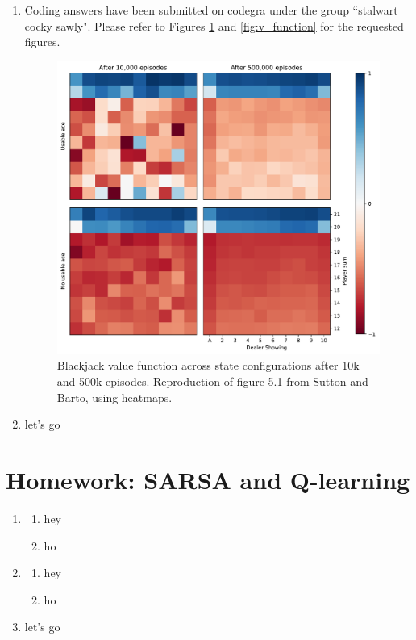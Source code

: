 \documentclass{article}
\begin{document}
\begin{enumerate}
	\item Coding answers have been submitted on codegra under the group ``stalwart cocky sawly".
	      Please refer to Figures \ref{fig:figure_5.1} and \ref{fig:v_function} for the requested figures.
	      \begin{figure}
		      \centering
		      \includegraphics[width=\textwidth]{fig_5.1}
		      \caption{Blackjack value function across state configurations after 10k and 500k episodes.
			      Reproduction of figure 5.1 from Sutton and Barto, using heatmaps.}
		      \label{fig:figure_5.1}
	      \end{figure}
	\item let's go
\end{enumerate}

\section*{Homework: SARSA and Q-learning}
\begin{enumerate}
	\item \begin{enumerate}
		      \item hey
		      \item ho
	      \end{enumerate}
	\item \begin{enumerate}
		      \item hey
		      \item ho
	      \end{enumerate}
	\item let's go
\end{enumerate}
\end{document}
